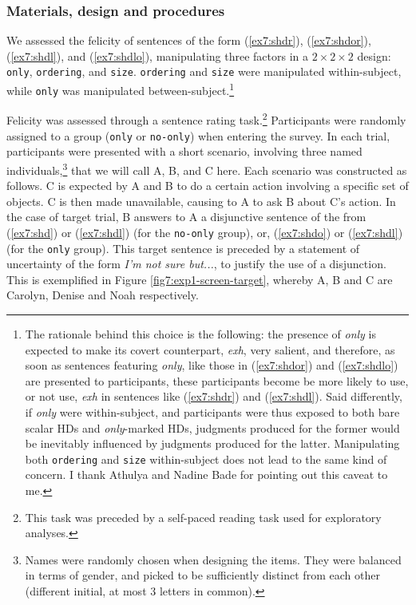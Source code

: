 \subsubsection{Materials, design and procedures}
We assessed the felicity of sentences of the form (\ref{ex7:shdr}), (\ref{ex7:shdor}), (\ref{ex7:shdl}), and (\ref{ex7:shdlo}), manipulating three factors in  a $2\times2\times2$ design: \texttt{only}, \texttt{ordering}, and \texttt{size}. \texttt{ordering} and \texttt{size} were manipulated within-subject, while \texttt{only} was manipulated between-subject.\footnote{The rationale behind this choice is the following: the presence of \textit{only} is expected to make its covert counterpart, \textit{exh}, very salient, and therefore, as soon as sentences featuring \textit{only}, like those in (\ref{ex7:shdor}) and (\ref{ex7:shdlo}) are presented to participants, these participants become be more likely to use, or not use, \textit{exh} in sentences like (\ref{ex7:shdr}) and  (\ref{ex7:shdl}). Said differently, if \textit{only} were within-subject, and participants were thus exposed to both bare scalar HDs and \textit{only}-marked HDs, judgments produced for the former would be inevitably influenced by judgments produced for the latter. Manipulating both \texttt{ordering} and \texttt{size} within-subject does not lead to the same kind of concern. I thank Athulya and Nadine Bade for pointing out this caveat to me.}


Felicity was assessed through a sentence rating task.\footnote{This task was preceded by a self-paced reading task used for exploratory analyses.} Participants were randomly assigned to a group (\texttt{only} or \texttt{no-only}) when entering the survey. In each trial, participants were presented with a short scenario, involving three named individuals,\footnote{Names were randomly chosen when designing the items. They were balanced in terms of gender, and picked to be sufficiently distinct from each other (different initial, at most $3$ letters in common).} that we will call A, B, and C here. Each scenario was constructed as follows. C is expected by A and B to do a certain action involving a specific set of objects. C is then made unavailable, causing to A to ask B about C's action. In the case of target trial, B answers to A a disjunctive sentence of the from (\ref{ex7:shd}) or (\ref{ex7:shdl}) (for the \texttt{no-only} group), or, (\ref{ex7:shdo}) or (\ref{ex7:shdl}) (for the \texttt{only} group). This target sentence is preceded by a statement of uncertainty of the form \textit{I'm not sure but...}, to justify the use of a disjunction. This is exemplified in Figure \ref{fig7:exp1-screen-target}, whereby A, B and C are Carolyn, Denise and Noah respectively.

